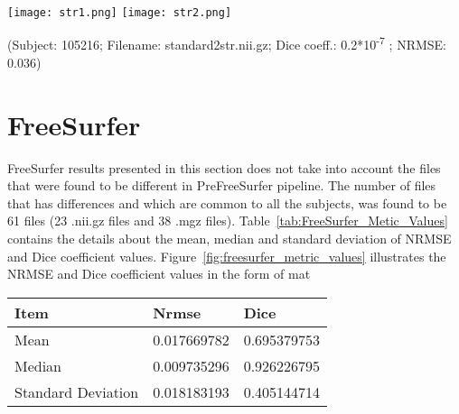 \hfill \break
\begin{center}
\texttt{[image: str1.png]}%
\texttt{[image: str2.png]}
\caption*{(Subject: 105216; Filename: standard2str.nii.gz; Dice coeff.: 0.2*10\textsuperscript{-7} ; NRMSE: 0.036)}
\label{fig:prefreesurfer_std_file}
\end{center}
\hfill \break

\section{FreeSurfer} \label{sec:Freesurfer}
FreeSurfer results presented in this section does not take into account the files that were found to be different in PreFreeSurfer pipeline. The number of files that has differences and which are common to all the subjects, was found to be 61 files (23 .nii.gz files and 38 .mgz files). Table~\ref{tab:FreeSurfer_Metic_Values} contains the details about the mean, median and standard deviation of NRMSE and Dice coefficient values. Figure~\ref{fig:freesurfer_metric_values} illustrates the NRMSE and Dice coefficient values in the form of mat
\hfill \break
\begin{center}
\begin{tabular}{|l|l|l|}
\hline
\textbf{Item}      & \textbf{Nrmse} & \textbf{Dice} \\ \hline
Mean               & 0.017669782    & 0.695379753   \\ \hline
Median             & 0.009735296    & 0.926226795   \\ \hline
Standard Deviation & 0.018183193    & 0.405144714   \\ \hline
\end{tabular}
\label{tab:FreeSurfer_Metic_Values}
\end{center}
\hfill \break

